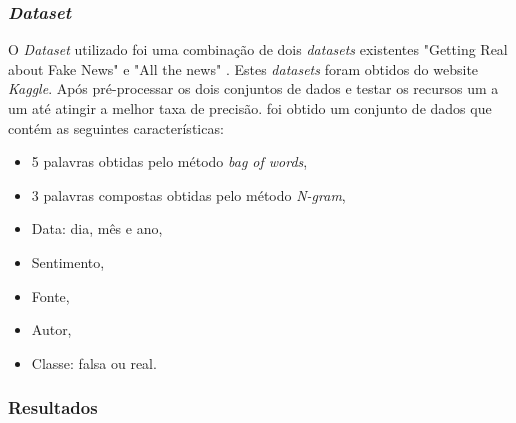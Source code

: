 \subsubsection{\textit{Dataset}}

O \textit{Dataset} utilizado foi uma combinação de dois \textit{datasets} existentes  "Getting Real about
Fake News" \cite{fakenews2016} e "All the news" \cite{allthenews2017}. Estes \textit{datasets} foram obtidos do website \textit{Kaggle}. Após pré-processar os dois conjuntos de dados e testar os recursos um a um até atingir a melhor taxa de precisão. foi obtido um conjunto de dados que contém as seguintes características:

\begin{itemize}
    \item 5 palavras obtidas pelo método \textit{bag of words},
    \item 3 palavras compostas obtidas pelo método \textit{N-gram},
    \item Data: dia, mês e ano,
    \item Sentimento,
    \item Fonte,
    \item Autor,
    \item Classe: falsa ou real. \\
\end{itemize}

\subsubsection{Resultados}



